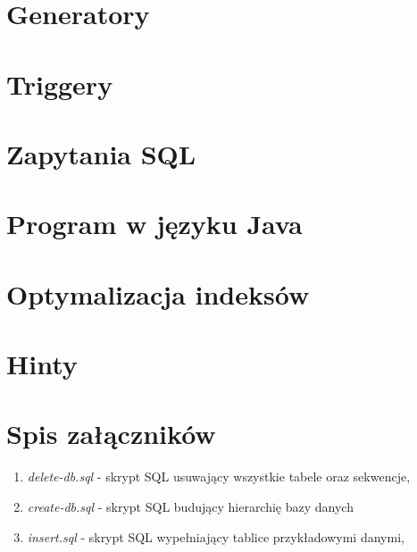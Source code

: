 \documentclass[11pt,a4paper]{article}
\begin{document}
\section{Generatory}

\section{Triggery}

\section{Zapytania SQL}

\section{Program w języku Java}

\section{Optymalizacja indeksów}

\section{Hinty}


\section*{Spis załączników}
\begin{enumerate}[label=\arabic*,ref=\arabic*]
\item \label{attach:create-db} \textit{delete-db.sql} - skrypt SQL usuwający wszystkie tabele oraz sekwencje,
\item \label{attach:delete-db} \textit{create-db.sql} - skrypt SQL budujący hierarchię bazy danych
\item \label{attach:insert} \textit{insert.sql} - skrypt SQL wypełniający tablice przykładowymi danymi,
\end{enumerate}
\end{document}
